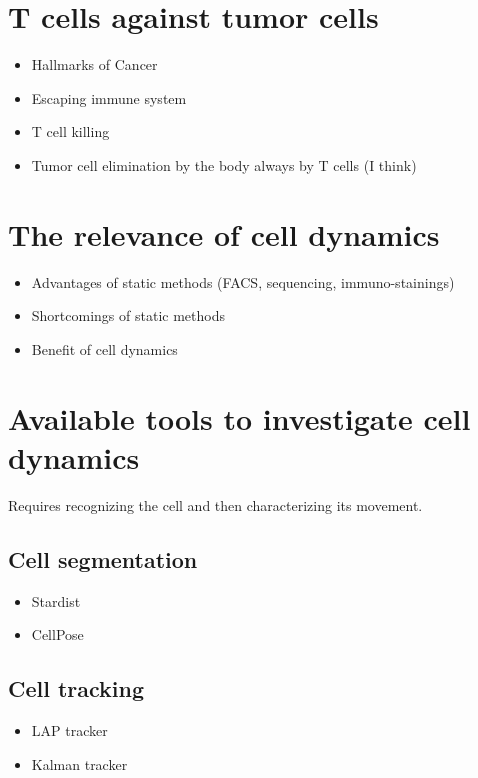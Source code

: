 \documentclass{report}
\begin{document}
\section{T cells against tumor cells}

\begin{itemize}
	\item Hallmarks of Cancer
	\item Escaping immune system
	\item T cell killing
	\item Tumor cell elimination by the body always by T cells (I think)
\end{itemize}

\section{The relevance of cell dynamics}

\begin{itemize}
	\item Advantages of static methods (FACS, sequencing, immuno-stainings)
	\item Shortcomings of static methods
	\item Benefit of cell dynamics
\end{itemize}

\section{Available tools to investigate cell dynamics}

Requires recognizing the cell and then characterizing its movement.

\subsection{Cell segmentation}

\begin{itemize}
	\item Stardist
	\item CellPose
\end{itemize}

\subsection{Cell tracking}

\begin{itemize}
	\item LAP tracker
	\item Kalman tracker
\end{itemize}
\end{document}

